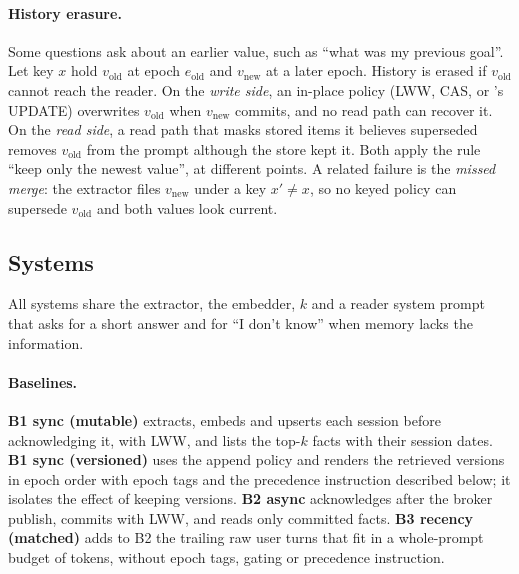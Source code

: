 \paragraph{History erasure.}
Some questions ask about an earlier value, such as ``what was my previous goal''. Let key $x$ hold $v_\text{old}$ at epoch $e_\text{old}$ and $v_\text{new}$ at a later epoch. History is erased if $v_\text{old}$ cannot reach the reader. On the \emph{write side}, an in-place policy (LWW, CAS, or \memzero{}'s UPDATE) overwrites $v_\text{old}$ when $v_\text{new}$ commits, and no read path can recover it. On the \emph{read side}, a read path that masks stored items it believes superseded removes $v_\text{old}$ from the prompt although the store kept it. Both apply the rule ``keep only the newest value'', at different points.
A related failure is the \emph{missed merge}: the extractor files $v_\text{new}$ under a key $x' \neq x$, so no keyed policy can supersede $v_\text{old}$ and both values look current.

\subsection{Systems}
\label{sec:systems}

All systems share the extractor, the embedder, $k$ and a reader system prompt that asks for a short answer and for ``I don't know'' when memory lacks the information.

\paragraph{Baselines.}
\textbf{B1 sync (mutable)} extracts, embeds and upserts each session before acknowledging it, with LWW, and lists the top-$k$ facts with their session dates. \textbf{B1 sync (versioned)} uses the append policy and renders the retrieved versions in epoch order with epoch tags and the precedence instruction described below; it isolates the effect of keeping versions. \textbf{B2 async} acknowledges after the broker publish, commits with LWW, and reads only committed facts. \textbf{B3 recency (matched)} adds to B2 the trailing raw user turns that fit in a whole-prompt budget of  tokens, without epoch tags, gating or precedence instruction.

